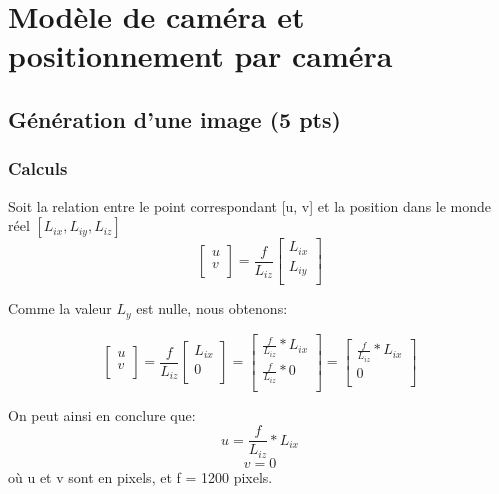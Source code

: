 \documentclass[12pt]{article}
\begin{document}
\section{Modèle de caméra et positionnement par caméra}

\subsection{Génération d'une image (5 pts)}
\label{generation_image}
\subsubsection{Calculs}
Soit la relation entre le point correspondant [u, v] et la position dans le monde r\'eel $ [L_{ix}, L_{iy}, L_{iz}] $
\[ \left[ {\begin{array}{c}
                u \\
    v \\ \end{array} } \right] =
    \frac{f}{L_{iz}}
    \left[ {\begin{array}{c} L_{ix} \\ L_{iy} \\ \end{array}} \right]
\]

Comme la valeur $L_y$ est nulle, nous obtenons:


\[ \left[ {\begin{array}{c}
                u \\
    v \\ \end{array} } \right] =
    \frac{f}{L_{iz}}
    \left[ {\begin{array}{c} L_{ix} \\ 0 \\ \end{array}} \right]
=
    \left[ {\begin{array}{c} \frac{f}{L_{iz}} * L_{ix} \\ \frac{f}{L_{iz}} * 0 \\ \end{array}} \right]
=
    \left[ {\begin{array}{c} \frac{f}{L_{iz}} * L_{ix} \\ 0 \\ \end{array}} \right]

\]

On peut ainsi en conclure que:
\[
    u =  \frac{f}{L_{iz}} * L_{ix}
\]
\[
    v = 0
\]
o\`u u et v sont en pixels, et f = 1200 pixels.
\end{document}
